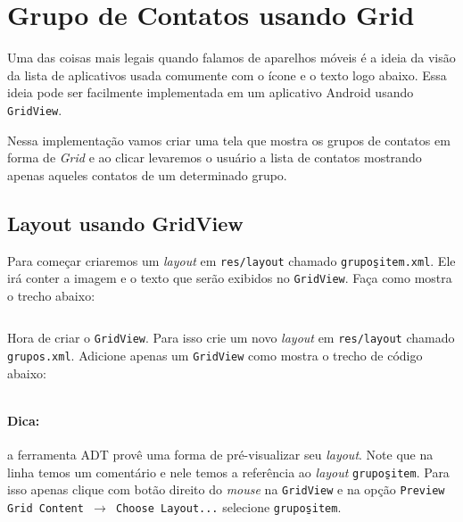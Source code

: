 \begin{listing}[H]
  \inputminted[linenos=true,frame=bottomline,tabsize=3]{ java }{ source/SalvarActivity-7.java }
  \caption{Obtem o valor padrão definido nas Preferências [SalvarActivity.java]}
\end{listing}

\section{Grupo de Contatos usando Grid}

Uma das coisas mais legais quando falamos de aparelhos móveis é a ideia da visão da lista de aplicativos
usada comumente com o ícone e o texto logo abaixo. Essa ideia pode ser facilmente implementada em
um aplicativo Android usando \texttt{GridView}.

Nessa implementação vamos criar uma tela que mostra os grupos de contatos em forma de \textit{Grid}
e ao clicar levaremos o usuário a lista de contatos mostrando apenas aqueles contatos de um determinado
grupo.

\subsection{Layout usando GridView}

Para começar criaremos um \textit{layout} em \texttt{res/layout} chamado \texttt{grupos\b{ }item.xml}.
Ele irá conter a imagem e o texto que serão exibidos no \texttt{GridView}. Faça como mostra o trecho abaixo:

\begin{listing}[H]
  \inputminted[linenos=true,frame=bottomline,tabsize=3]{ xml }{ source/grupos_item-1.xml }
  \caption{Item do Layout de Grupos [res/layout/grupos\b{ }item.xml]}
\end{listing}

Hora de criar o \texttt{GridView}. Para isso crie um novo \textit{layout} em \texttt{res/layout} chamado
\texttt{grupos.xml}. Adicione apenas um \texttt{GridView} como mostra o trecho de código abaixo:

\begin{listing}[H]
  \inputminted[linenos=true,frame=bottomline,tabsize=3]{ xml }{ source/grupos-1.xml }
  \caption{Layout de Grupos [res/layout/grupos.xml]}
\end{listing}

\paragraph{Dica:} a ferramenta ADT provê uma forma de pré-visualizar seu \textit{layout}. Note que
na linha  temos um comentário e nele temos a referência ao \textit{layout}
\texttt{grupos\b{ }item}. Para isso apenas clique com botão direito do \textit{mouse} na \texttt{GridView}
e na opção \texttt{Preview Grid Content $\rightarrow$ Choose Layout...} selecione \texttt{grupos\b{ }item}.

